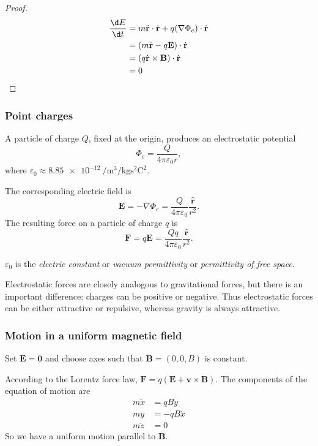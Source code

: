 \documentclass[a4paper]{article}
\begin{document}
\begin{proof}
  \begin{align*}
    \frac{\d E}{\d t} &= m\ddot{\mathbf{r}}\cdot \dot{\mathbf{r}} + q(\nabla \Phi_e)\cdot \dot{\mathbf{r}}\\
    &= (m\ddot{\mathbf{r}} - q\mathbf{E}) \cdot \dot{\mathbf{r}}\\
    &= (q\dot{\mathbf{r}}\times \mathbf{B})\cdot \dot{\mathbf{r}}\\
    &= 0
  \end{align*}
\end{proof}

\subsubsection{Point charges}
\begin{law}
  A particle of charge $Q$, fixed at the origin, produces an electrostatic potential
  \[
    \Phi_e = \frac{Q}{4\pi\varepsilon_0 r},
  \]
  where $\varepsilon_0 \approx \SI{8.85e-12}{\per\meter\cubed\per\kilogram\second\squared\coulomb\squared}$.

  The corresponding electric field is 
  \[
    \mathbf{E} = -\nabla \Phi_e = \frac{Q}{4\pi\varepsilon_0} \frac{\hat{\mathbf{r}}}{r^2}.
  \]
  The resulting force on a particle of charge $q$ is
  \[
    \mathbf{F} = q\mathbf{E} = \frac{Qq}{4\pi\varepsilon_0}\frac{\hat{\mathbf{r}}}{r^2}.
  \]
\end{law}
\begin{defi}
  $\varepsilon_0$ is the \emph{electric constant} or \emph{vacuum permittivity} or \emph{permittivity of free space}.
\end{defi}

Electrostatic forces are closely analogous to gravitational forces, but there is an important difference: charges can be positive or negative. Thus electrostatic forces can be either attractive or repulsive, whereas gravity is always attractive.

\subsubsection{Motion in a uniform magnetic field}
Set $\mathbf{E} = \mathbf{0}$ and choose axes such that $\mathbf{B} = (0, 0, B)$ is constant.

According to the Lorentz force law, $\mathbf{F} = q(\mathbf{E} + \mathbf{v}\times \mathbf{B})$. The components of the equation of motion are
\begin{align*}
  m\ddot{x} &= qB\dot{y}\tag{1}\\
  m\ddot{y} &= -qB\dot{x}\tag{2}\\
  m\ddot{z} &= 0
\end{align*}
So we have a uniform motion parallel to $\mathbf{B}$.
\end{document}
